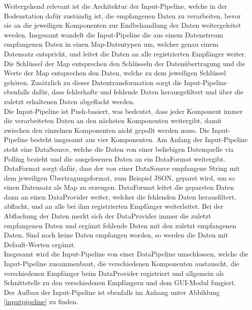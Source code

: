 Weitergehend relevant ist die Architektur der Input-Pipeline, welche in der Bodenstation dafür zuständig ist, die empfangenen Daten zu verarbeiten, bevor sie an die jeweiligen Komponenten zur Endbehandlung der Daten weitergeleitet werden. Insgesamt wandelt die Input-Pipeline die aus einem Datenstream empfangenen Daten in einen Map-Datentypen um, welcher genau einem Datensatz entspricht, und leitet die Daten an alle registrierten Empfänger weiter. Die Schlüssel der Map entsprechen den Schlüsseln der Datenübertragung und die Werte der Map entsprechen den Daten, welche zu dem jeweiligen Schlüssel gehören. Zusätzlich zu dieser Datentransformation sorgt die Input-Pipeline ebenfalls dafür, dass fehlerhafte und fehlende Daten herausgefiltert und über die zuletzt erhaltenen Daten abgeflacht werden. \\
Die Input-Pipeline ist Push-basiert, was bedeutet, dass jeder Komponent immer die verarbeiteten Daten an den nächsten Komponenten weitergibt, damit zwischen den einzelnen Komponenten nicht gepollt werden muss. Die Input-Pipeline besteht insgesamt aus vier Komponenten. Am Anfang der Input-Pipeline steht eine DataSource, welche die Daten von einer beliebigen Datenquelle via Polling bezieht und die ausgelesenen Daten an ein DataFormat weitergibt. DataFormat sorgt dafür, dass der von einer DataSource empfangene String mit dem jeweiligen Übertragungsformat, zum Beispiel JSON, geparst wird, um so einen Datensatz als Map zu erzeugen. DataFormat leitet die geparsten Daten dann an einen DataProvider weiter, welcher die fehlenden Daten herausfiltert, abflacht, und an alle bei ihm registrierten Empfänger weiterleitet. Bei der Abflachung der Daten merkt sich der DataProvider immer die zuletzt empfangenen Daten und ergänzt fehlende Daten mit den zuletzt empfangenen Daten. Sind noch keine Daten empfangen worden, so werden die Daten mit Default-Werten ergänzt. \\
Insgesamt wird die Input-Pipeline von einer DataPipeline umschlossen, welche die Input-Pipeline zusammenbaut, die verschiedenen Komponenten austauscht, die verschiedenen Empfänger beim DataProvider registriert und allgemein als Schnittstelle zu den verschiedenen Empfängern und dem GUI-Modul fungiert. \\
Der Aufbau der Input-Pipeline ist ebenfalls im Anhang unter Abbildung \ref{inputpipeline} zu finden.